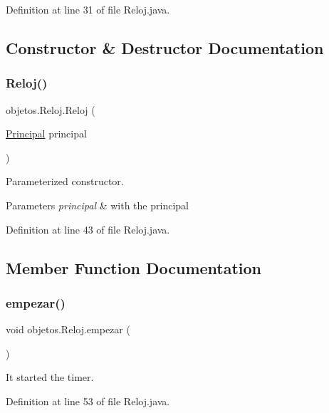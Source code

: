 Definition at line 31 of file Reloj.\+java.



\subsection{Constructor \& Destructor Documentation}
\mbox{\label{classobjetos_1_1_reloj_aa15ad3d750972a2e0778c54b07847b1a}} 
\subsubsection{\texorpdfstring{Reloj()}{Reloj()}}
{\footnotesize\ttfamily objetos.\+Reloj.\+Reloj (\begin{DoxyParamCaption}\item[{\mbox{\hyperlink{classvistas_1_1_principal}{Principal}}}]{principal }\end{DoxyParamCaption})}

Parameterized constructor.


\begin{DoxyParams}{Parameters}
{\em principal} & with the principal \\
\hline
\end{DoxyParams}


Definition at line 43 of file Reloj.\+java.



\subsection{Member Function Documentation}
\mbox{\label{classobjetos_1_1_reloj_a8568b99d4457c01294d2078b033330a4}} 
\subsubsection{\texorpdfstring{empezar()}{empezar()}}
{\footnotesize\ttfamily void objetos.\+Reloj.\+empezar (\begin{DoxyParamCaption}{ }\end{DoxyParamCaption})}

It started the timer. 

Definition at line 53 of file Reloj.\+java.

